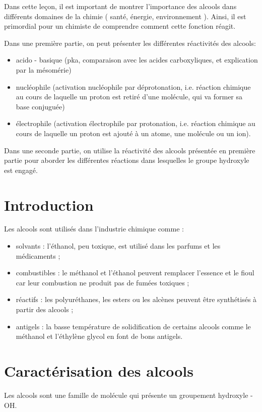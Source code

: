 \documentclass[11pt]{report}
\numberwithin{figure}{section}
\numberwithin{equation}{section}
\numberwithin{table}{section}
\newcommand{\1}{\boldsymbol{1}}
\begin{document}
Dans cette leçon, il est important de montrer l’importance des alcools dans différents domaines de la chimie ( santé, énergie, environnement ). Ainsi, il est primordial pour un chimiste de comprendre comment cette fonction réagit. 

Dans une première partie, on peut présenter les différentes réactivités des alcools:
\begin{itemize}
\item acido - basique (pka, comparaison avec les acides carboxyliques, et explication par la mésomérie)
\item nucléophile (activation nucléophile par déprotonation, i.e. réaction chimique au cours de laquelle un proton  est retiré d'une molécule, qui va former sa base conjuguée)
\item électrophile (activation électrophile par protonation, i.e. réaction chimique au cours de laquelle un proton est ajouté à un atome, une molécule ou un ion).
\end{itemize}
Dans une seconde partie, on utilise la réactivité des alcools présentée en première partie pour aborder les
différentes réactions dans lesquelles le groupe hydroxyle est engagé. 

\section*{Introduction}

Les alcools sont utilisés dans l'industrie chimique comme :
\begin{itemize}
\item solvants : l'éthanol, peu toxique, est utilisé dans les parfums et les médicaments ;
\item combustibles : le méthanol et l'éthanol peuvent remplacer l'essence et le fioul car leur combustion ne produit pas de fumées toxiques ;
\item réactifs : les polyuréthanes, les esters ou les alcènes peuvent être synthétisés à partir des alcools ;
\item antigels : la basse température de solidification de certains alcools comme le méthanol et l'éthylène glycol en font de bons antigels.
\end{itemize}

\section{Caractérisation des alcools}

Les alcools sont une famille de molécule qui présente un groupement hydroxyle -OH.
\end{document}
